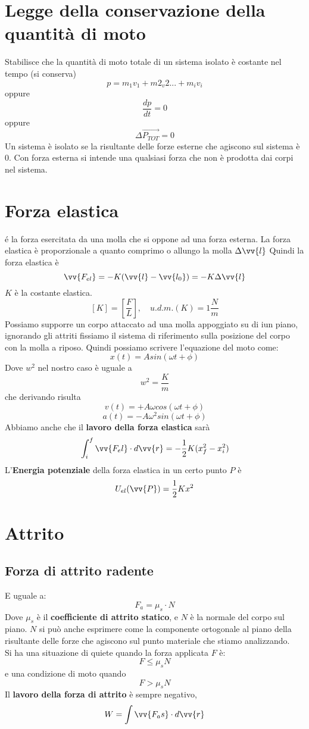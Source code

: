\documentclass[a4paper]{report}
\begin{document}
  \section{Legge della conservazione della quantità di moto}
  Stabilisce che la quantità di moto totale di un sistema isolato è costante nel tempo (si conserva)
  $$ p = m_1v_1 + m2_v2 ... + m_iv_i $$
  oppure
  $$ \frac{dp}{dt} = 0 $$
  oppure
  $$ \Delta \vec{P_{TOT}} = 0 $$
  Un sistema è isolato se la risultante delle forze esterne che agiscono sul sistema è 0. Con forza esterna si intende una qualsiasi forza che non è prodotta dai corpi nel sistema.

  \section{Forza elastica}
  é la forza esercitata da una molla che si oppone ad una forza esterna. La forza elastica è proporzionale a quanto comprimo o allungo la molla $\Delta \vv{l}$
  Quindi la forza elastica è
  $$ \vv{F_{el}} = -K(\vv{l} - \vv{l_0}) = -K \Delta \vv{l} $$
  $K$ è la costante elastica.
  $$[K] = [\frac{F}{L}], \quad u.d.m.(K) = 1 \frac{N}{m}$$
  Possiamo supporre un corpo attaccato ad una molla appoggiato su di iun piano, ignorando gli attriti fissiamo il sistema di riferimento sulla posizione del corpo con la molla a riposo. Quindi possiamo scrivere l'equazione del moto come:
  $$x(t) = A sin(\omega t + \phi)$$
  Dove $w^2$ nel nostro caso è uguale a
  $$ w^2 = \frac{K}{m} $$
  che derivando risulta
  $$ v(t) = + A \omega cos(\omega t + \phi) $$
  $$ a(t) = -A \omega^2 sin (\omega t + \phi) $$
  Abbiamo anche che il \textbf{lavoro della forza elastica} sarà
  $$ \int_i^f \vv{F_el} \cdot d\vv{r} = - \frac{1}{2} K (x_f^2 -x_i^2)$$
  L'\textbf{Energia potenziale} della forza elastica in un certo punto $P$ è
  $$ U_{el}(\vv{P}) = \frac{1}{2} K x^2$$


  \section{Attrito}
  \subsection{Forza di attrito radente}
  E uguale a:
  $$ F_a = \mu_s \cdot N$$
  Dove $\mu_s$ è il \textbf{coefficiente di attrito statico}, e $N$ è la normale del corpo sul piano. $N$ si può anche esprimere come la componente ortogonale al piano della risultante delle forze che agiscono sul punto materiale che stiamo analizzando.
  \\Si ha una situazione di quiete quando la forza applicata $F$ è:
  $$ F \leq \mu_s N $$
  e una condizione di moto quando
  $$ F > \mu_s N $$
  Il \textbf{lavoro della forza di attrito} è sempre negativo,
  $$ W = \int \vv{F_as} \cdot d\vv{r}$$
\end{document}
